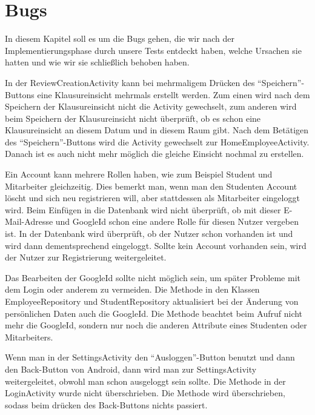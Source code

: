 
\section{Bugs}

	In diesem Kapitel soll es um die Bugs gehen, die wir nach der Implementierungsphase durch unsere Tests entdeckt haben, welche Ursachen sie hatten und wie wir sie schließlich behoben haben.

		{In der ReviewCreationActivity kann bei mehrmaligem Drücken des \enquote{Speichern}-Buttons eine Klausureinsicht mehrmals erstellt werden.}
		{Zum einen wird nach dem Speichern der Klausureinsicht nicht die Activity gewechselt, zum anderen wird beim Speichern der Klausureinsicht nicht überprüft, ob es schon eine Klausureinsicht an diesem Datum und in diesem Raum gibt.}
		{Nach dem Betätigen des \enquote{Speichern}-Buttons wird die Activity gewechselt zur HomeEmployeeActivity. Danach ist es auch nicht mehr möglich die gleiche Einsicht nochmal zu erstellen.}

		{Ein Account kann mehrere Rollen haben, wie zum Beispiel Student und Mitarbeiter gleichzeitig. Dies bemerkt man, wenn man den Studenten Account löscht und sich neu registrieren will, aber stattdessen als Mitarbeiter eingeloggt wird.}
		{Beim Einfügen in die Datenbank wird nicht überprüft, ob mit dieser E-Mail-Adresse und GoogleId schon eine andere Rolle für diesen Nutzer vergeben ist.}
		{In der Datenbank wird überprüft, ob der Nutzer schon vorhanden ist und wird dann dementsprechend eingeloggt. Sollte kein Account vorhanden sein, wird der Nutzer zur Registrierung weitergeleitet.}

		{Das Bearbeiten der GoogleId sollte nicht möglich sein, um später Probleme mit dem Login oder anderem zu vermeiden.}
		{Die Methode  in den Klassen EmployeeRepository und StudentRepository aktualisiert bei der Änderung von persönlichen Daten auch die GoogleId.}
		{Die Methode  beachtet beim Aufruf nicht mehr die GoogleId, sondern nur noch die anderen Attribute eines Studenten oder Mitarbeiters.}

		{Wenn man in der SettingsActivity den \enquote{Ausloggen}-Button benutzt und dann den Back-Button von Android, dann wird man zur SettingsActivity weitergeleitet, obwohl man schon ausgeloggt sein sollte.}
		{Die Methode  in der LoginActivity wurde nicht überschrieben.}
		{Die Methode  wird überschrieben, sodass beim drücken des Back-Buttons nichts passiert.}

